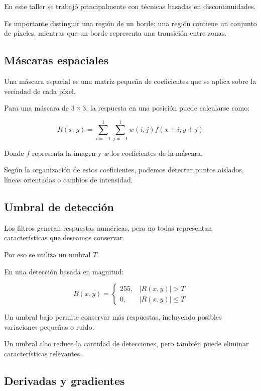 \documentclass[11pt,letterpaper]{article}
\begin{document}
En este taller se trabajó principalmente
con técnicas basadas en discontinuidades.

Es importante distinguir una región de
un borde: una región contiene un conjunto
de píxeles, mientras que un borde representa
una transición entre zonas.

\subsection{Máscaras espaciales}

Una máscara espacial es una matriz pequeña
de coeficientes que se aplica sobre la
vecindad de cada píxel.

Para una máscara de $3\times3$, la respuesta
en una posición puede calcularse como:

\begin{equation}
R(x,y)=
\sum_{i=-1}^{1}
\sum_{j=-1}^{1}
w(i,j)f(x+i,y+j)
\end{equation}

Donde $f$ representa la imagen y $w$
los coeficientes de la máscara.

Según la organización de estos coeficientes,
podemos detectar puntos aislados,
líneas orientadas o cambios de intensidad.

\subsection{Umbral de detección}

Los filtros generan respuestas numéricas,
pero no todas representan características
que deseamos conservar.

Por eso se utiliza un umbral $T$.

En una detección basada en magnitud:

\begin{equation}
B(x,y)=
\begin{cases}
255, & |R(x,y)|>T\\
0, & |R(x,y)|\leq T
\end{cases}
\end{equation}

Un umbral bajo permite conservar más respuestas,
incluyendo posibles variaciones pequeñas o ruido.

Un umbral alto reduce la cantidad de detecciones,
pero también puede eliminar características
relevantes.

\subsection{Derivadas y gradientes}
\end{document}
